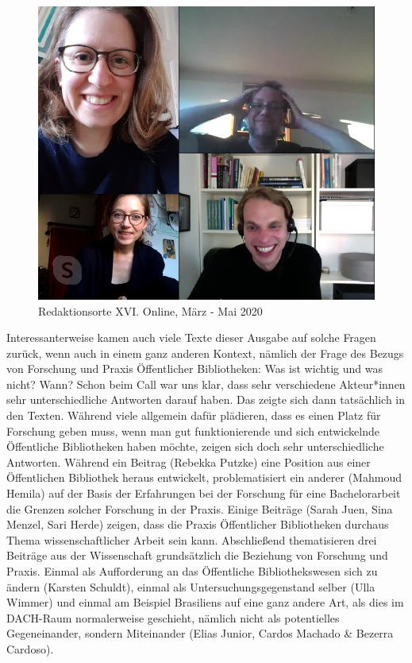 \documentclass[a4paper,
fontsize=11pt,
oneside,
numbers=noperiodatend,
parskip=half-,
bibliography=totoc,
final
]{scrartcl}
\begin{document}
\begin{figure}
\centering
\includegraphics{img/redaktionscall3.jpeg}
\caption{Redaktionsorte XVI. Online, März - Mai 2020}
\end{figure}

Interessanterweise kamen auch viele Texte dieser Ausgabe auf solche
Fragen zurück, wenn auch in einem ganz anderen Kontext, nämlich der
Frage des Bezugs von Forschung und Praxis Öffentlicher Bibliotheken: Was
ist wichtig und was nicht? Wann? Schon beim Call war uns klar, dass sehr
verschiedene Akteur*innen sehr unterschiedliche Antworten darauf haben.
Das zeigte sich dann tatsächlich in den Texten. Während viele allgemein
dafür plädieren, dass es einen Platz für Forschung geben muss, wenn man
gut funktionierende und sich entwickelnde Öffentliche Bibliotheken haben
möchte, zeigen sich doch sehr unterschiedliche Antworten. Während ein
Beitrag (Rebekka Putzke) eine Position aus einer Öffentlichen Bibliothek
heraus entwickelt, problematisiert ein anderer (Mahmoud Hemila) auf der
Basis der Erfahrungen bei der Forschung für eine Bachelorarbeit die
Grenzen solcher Forschung in der Praxis. Einige Beiträge (Sarah Juen,
Sina Menzel, Sari Herde) zeigen, dass die Praxis Öffentlicher
Bibliotheken durchaus Thema wissenschaftlicher Arbeit sein kann.
Abschließend thematisieren drei Beiträge aus der Wissenschaft
grundsätzlich die Beziehung von Forschung und Praxis. Einmal als
Aufforderung an das Öffentliche Bibliothekswesen sich zu ändern (Karsten
Schuldt), einmal als Untersuchungsgegenstand selber (Ulla Wimmer) und
einmal am Beispiel Brasiliens auf eine ganz andere Art, als dies im
DACH-Raum normalerweise geschieht, nämlich nicht als potentielles
Gegeneinander, sondern Miteinander (Elias Junior, Cardos Machado \&
Bezerra Cardoso).
\end{document}

